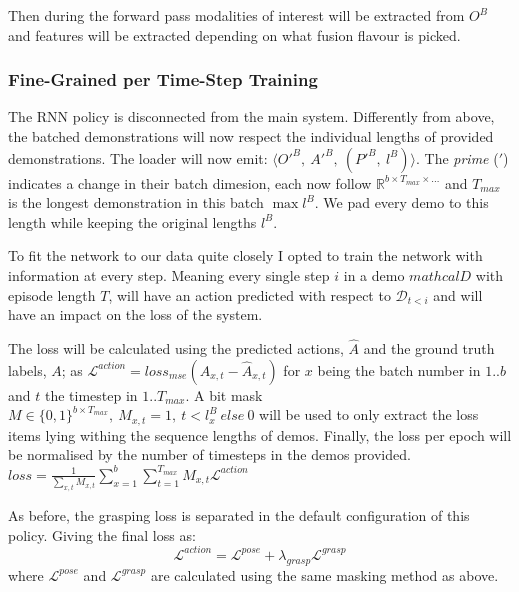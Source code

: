 Then during the forward pass modalities of interest will be extracted from $O^B$ and features will be extracted depending on what fusion flavour is picked.



\subsubsection{Fine-Grained per Time-Step Training}
The RNN policy is disconnected from the main system. Differently from above, the batched demonstrations will now respect the individual lengths of provided demonstrations. The loader will now emit: \( \langle {O'}^B, ~{A'}^B, ~\left( {P'}^B, ~l^B \right) \rangle\). The \emph{prime} ($'$) indicates a change in their batch dimesion, each now follow $\mathbb{R}^{b \times T_{max} \times \ldots}$ and  $T_{max}$ is the longest demonstration in this batch \(\max l^{B}\). We pad every demo to this length while keeping the original lengths $l^{B}$.

To fit the network to our data quite closely I opted to train the network with information at every step. Meaning every single step $i$ in a demo $mathcal{D}$ with episode length $T$, will have an action predicted with respect to $\mathcal{D}_{t < i}$ and will have an impact on the loss of the system. 

The loss will be calculated using the predicted actions, $\hat{A}$ and the ground truth labels, $A$; as \( \mathcal{L}^{action} = {loss}_{mse}\left(A_{x, t} - \hat{A}_{x, t}\right)\) for $x$ being the batch number in $1..b$ and $t$ the timestep in $1..T_{max}$. A bit mask \(M \in \{0, 1\}^{b \times T_{max}}, ~M_{x, t} = 1, ~t < l^B_x ~else ~0\) will be used to only extract the loss items lying withing the sequence lengths of demos. Finally, the loss per epoch will be normalised by the number of timesteps in the demos provided. \(loss = \frac{1}{\sum_{x, t}M_{x, t}}{\sum_{x = 1}^{b}\sum_{t = 1}^{T_{max}}M_{x, t} \mathcal{L}^{action}}\)

As before, the grasping loss is separated in the default configuration of this policy. Giving the final loss as: 
\[
  \mathcal{L}^{action} = \mathcal{L}^{pose} + \lambda_{grasp} \mathcal{L}^{grasp}
\]
where $\mathcal{L}^{pose}$ and $\mathcal{L}^{grasp}$ are calculated using the same masking method as above.



